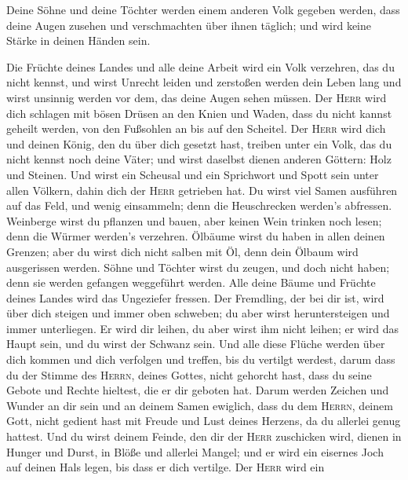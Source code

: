  Deine Söhne und deine Töchter werden einem anderen Volk
gegeben werden, dass deine Augen zusehen und verschmachten über ihnen
täglich; und wird keine Stärke in deinen Händen sein.

 Die Früchte deines Landes und alle deine Arbeit wird ein
Volk verzehren, das du nicht kennst, und wirst Unrecht leiden und
zerstoßen werden dein Leben lang  und wirst unsinnig
werden vor dem, das deine Augen sehen müssen.  Der
\textsc{Herr} wird dich schlagen mit bösen Drüsen an den Knien und
Waden, dass du nicht kannst geheilt werden, von den Fußsohlen an bis auf
den Scheitel.  Der \textsc{Herr} wird dich und deinen
König, den du über dich gesetzt hast, treiben unter ein Volk, das du
nicht kennst noch deine Väter; und wirst daselbst dienen anderen
Göttern: Holz und Steinen.  Und wirst ein Scheusal und
ein Sprichwort und Spott sein unter allen Völkern, dahin dich der
\textsc{Herr} getrieben hat.  Du wirst viel Samen
ausführen auf das Feld, und wenig einsammeln; denn die Heuschrecken
werden's abfressen.  Weinberge wirst du pflanzen und
bauen, aber keinen Wein trinken noch lesen; denn die Würmer werden's
verzehren.  Ölbäume wirst du haben in allen deinen
Grenzen; aber du wirst dich nicht salben mit Öl, denn dein Ölbaum wird
ausgerissen werden.  Söhne und Töchter wirst du zeugen,
und doch nicht haben; denn sie werden gefangen weggeführt werden.
 Alle deine Bäume und Früchte deines Landes wird das
Ungeziefer fressen.  Der Fremdling, der bei dir ist, wird
über dich steigen und immer oben schweben; du aber wirst heruntersteigen
und immer unterliegen.  Er wird dir leihen, du aber wirst
ihm nicht leihen; er wird das Haupt sein, und du wirst der Schwanz sein.
 Und alle diese Flüche werden über dich kommen und dich
verfolgen und treffen, bis du vertilgt werdest, darum dass du der Stimme
des \textsc{Herrn}, deines Gottes, nicht gehorcht hast, dass du seine
Gebote und Rechte hieltest, die er dir geboten hat. 
Darum werden Zeichen und Wunder an dir sein und an deinem Samen
ewiglich,  dass du dem \textsc{Herrn}, deinem Gott, nicht
gedient hast mit Freude und Lust deines Herzens, da du allerlei genug
hattest.  Und du wirst deinem Feinde, den dir der
\textsc{Herr} zuschicken wird, dienen in Hunger und Durst, in Blöße und
allerlei Mangel; und er wird ein eisernes Joch auf deinen Hals legen,
bis dass er dich vertilge.  Der \textsc{Herr} wird ein
